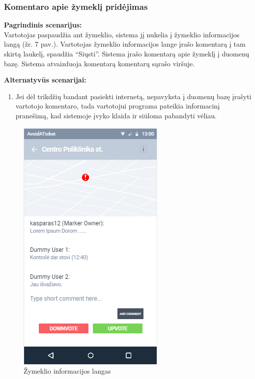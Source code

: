 \documentclass{VUMIFPSkursinis}
\begin{document}
\subsubsection{Komentaro apie žymeklį pridėjimas}
	\textbf{Pagrindinis scenarijus:}\\
    Vartotojas paspaudžia ant žymeklio, sistema jį nukelia į žymeklio informacijos langą (žr. 7 pav.). Vartotojas žymeklio informacijos lange 
	įrašo komentarą į tam skirtą laukelį, spaudžia “Siųsti”. Sistema įrašo komentarą apie žymeklį į duomenų bazę. Sistema 
	atvaizduoja komentarą komentarų sąrašo viršuje.

	\textbf{Alternatyvūs scenarijai:}
	\begin{enumerate}[itemsep=-2mm]
		\item Jei dėl trikdžių bandant pasiekti internetą, nepavyksta į duomenų bazę įrašyti vartotojo komentaro, tada vartotojui programa pateikia informacinį pranešimą, kad sistemoje įvyko klaida ir siūloma pabandyti vėliau.
	\end{enumerate} 
	\begin{figure}[H]
				\centering
				\includegraphics[scale=0.6]{img/mockup_markerInfoWindow}
				\caption{Žymeklio informacijos langas}
				\label{img:Žymeklio informacijos langas}
			\end{figure}
\end{document}
